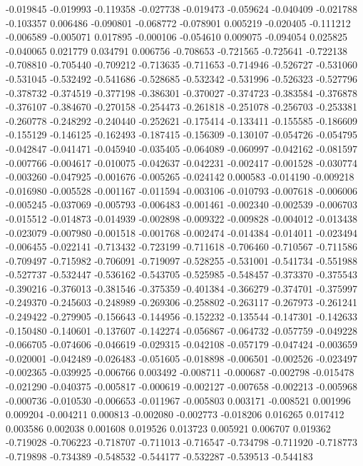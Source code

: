 -0.019845
-0.019993
-0.119358
-0.027738
-0.019473
-0.059624
-0.040409
-0.021788
-0.103357
0.006486
-0.090801
-0.068772
-0.078901
0.005219
-0.020405
-0.111212
-0.006589
-0.005071
0.017895
-0.000106
-0.054610
0.009075
-0.094054
0.025825
-0.040065
0.021779
0.034791
0.006756
-0.708653
-0.721565
-0.725641
-0.722138
-0.708810
-0.705440
-0.709212
-0.713635
-0.711653
-0.714946
-0.526727
-0.531060
-0.531045
-0.532492
-0.541686
-0.528685
-0.532342
-0.531996
-0.526323
-0.527796
-0.378732
-0.374519
-0.377198
-0.386301
-0.370027
-0.374723
-0.383584
-0.376878
-0.376107
-0.384670
-0.270158
-0.254473
-0.261818
-0.251078
-0.256703
-0.253381
-0.260778
-0.248292
-0.240440
-0.252621
-0.175414
-0.133411
-0.155585
-0.186609
-0.155129
-0.146125
-0.162493
-0.187415
-0.156309
-0.130107
-0.054726
-0.054795
-0.042847
-0.041471
-0.045940
-0.035405
-0.064089
-0.060997
-0.042162
-0.081597
-0.007766
-0.004617
-0.010075
-0.042637
-0.042231
-0.002417
-0.001528
-0.030774
-0.003260
-0.047925
-0.001676
-0.005265
-0.024142
0.000583
-0.014190
-0.009218
-0.016980
-0.005528
-0.001167
-0.011594
-0.003106
-0.010793
-0.007618
-0.006006
-0.005245
-0.037069
-0.005793
-0.006483
-0.001461
-0.002340
-0.002539
-0.006703
-0.015512
-0.014873
-0.014939
-0.002898
-0.009322
-0.009828
-0.004012
-0.013438
-0.023079
-0.007980
-0.001518
-0.001768
-0.002474
-0.014384
-0.014011
-0.023494
-0.006455
-0.022141
-0.713432
-0.723199
-0.711618
-0.706460
-0.710567
-0.711586
-0.709497
-0.715982
-0.706091
-0.719097
-0.528255
-0.531001
-0.541734
-0.551988
-0.527737
-0.532447
-0.536162
-0.543705
-0.525985
-0.548457
-0.373370
-0.375543
-0.390216
-0.376013
-0.381546
-0.375359
-0.401384
-0.366279
-0.374701
-0.375997
-0.249370
-0.245603
-0.248989
-0.269306
-0.258802
-0.263117
-0.267973
-0.261241
-0.249422
-0.279905
-0.156643
-0.144956
-0.152232
-0.135544
-0.147301
-0.142633
-0.150480
-0.140601
-0.137607
-0.142274
-0.056867
-0.064732
-0.057759
-0.049228
-0.066705
-0.074606
-0.046619
-0.029315
-0.042108
-0.057179
-0.047424
-0.003659
-0.020001
-0.042489
-0.026483
-0.051605
-0.018898
-0.006501
-0.002526
-0.023497
-0.002365
-0.039925
-0.006766
0.003492
-0.008711
-0.000687
-0.002798
-0.015478
-0.021290
-0.040375
-0.005817
-0.000619
-0.002127
-0.007658
-0.002213
-0.005968
-0.000736
-0.010530
-0.006653
-0.011967
-0.005803
0.003171
-0.008521
0.001996
0.009204
-0.004211
0.000813
-0.002080
-0.002773
-0.018206
0.016265
0.017412
0.003586
0.002038
0.001608
0.019526
0.013723
0.005921
0.006707
0.019362
-0.719028
-0.706223
-0.718707
-0.711013
-0.716547
-0.734798
-0.711920
-0.718773
-0.719898
-0.734389
-0.548532
-0.544177
-0.532287
-0.539513
-0.544183
